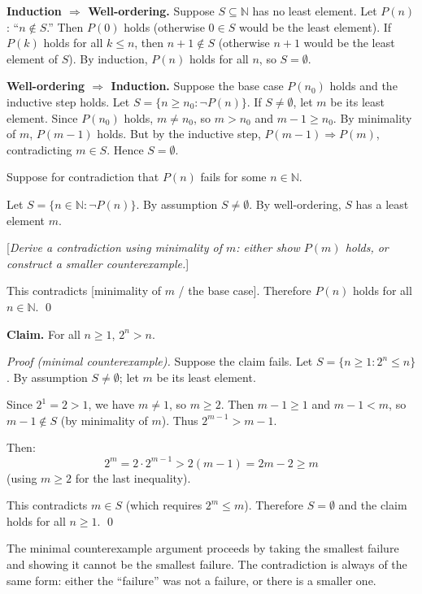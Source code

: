 \NoLocalDependencies

\begin{remark}
\textbf{Induction $\Rightarrow$ Well-ordering.}
Suppose $S \subseteq \mathbb{N}$ has no least element.
Let $P(n)$: ``$n \notin S$.''
Then $P(0)$ holds (otherwise $0 \in S$ would be the least element).
If $P(k)$ holds for all $k \leq n$, then $n+1 \notin S$ (otherwise
$n+1$ would be the least element of $S$). By induction, $P(n)$ holds
for all $n$, so $S = \emptyset$.

\medskip
\noindent\textbf{Well-ordering $\Rightarrow$ Induction.}
Suppose the base case $P(n_0)$ holds and the inductive step holds.
Let $S = \{n \geq n_0 : \neg P(n)\}$. If $S \neq \emptyset$, let $m$ be
its least element. Since $P(n_0)$ holds, $m \neq n_0$, so $m > n_0$
and $m - 1 \geq n_0$. By minimality of $m$, $P(m-1)$ holds.
But by the inductive step, $P(m-1) \Rightarrow P(m)$, contradicting
$m \in S$. Hence $S = \emptyset$.
\end{remark}

\begin{tcolorbox}[colback=gray!4, colframe=gray!35, arc=2pt,
  left=6pt, right=6pt, top=4pt, bottom=4pt,
  title={\small\textbf{Template: Minimal Counterexample}},
  fonttitle=\small\bfseries]
Suppose for contradiction that $P(n)$ fails for some $n \in \mathbb{N}$.

Let $S = \{n \in \mathbb{N} : \neg P(n)\}$.
By assumption $S \neq \emptyset$.
By well-ordering, $S$ has a least element $m$.

[\emph{Derive a contradiction using minimality of $m$: either show
$P(m)$ holds, or construct a smaller counterexample.}]

This contradicts [minimality of $m$ / the base case].
Therefore $P(n)$ holds for all $n \in \mathbb{N}$. \qed
\end{tcolorbox}

\begin{example}
\textbf{Claim.} For all $n \geq 1$, $2^n > n$.

\medskip
\noindent\textit{Proof (minimal counterexample).}
Suppose the claim fails. Let $S = \{n \geq 1 : 2^n \leq n\}$.
By assumption $S \neq \emptyset$; let $m$ be its least element.

Since $2^1 = 2 > 1$, we have $m \neq 1$, so $m \geq 2$.
Then $m - 1 \geq 1$ and $m - 1 < m$, so $m - 1 \notin S$
(by minimality of $m$). Thus $2^{m-1} > m - 1$.

Then:
\[
2^m = 2 \cdot 2^{m-1} > 2(m-1) = 2m - 2 \geq m
\]
(using $m \geq 2$ for the last inequality).

This contradicts $m \in S$ (which requires $2^m \leq m$).
Therefore $S = \emptyset$ and the claim holds for all $n \geq 1$. \qed

\medskip
\noindent
The minimal counterexample argument proceeds by taking the smallest
failure and showing it cannot be the smallest failure. The contradiction
is always of the same form: either the ``failure'' was not a failure,
or there is a smaller one.
\end{example}
